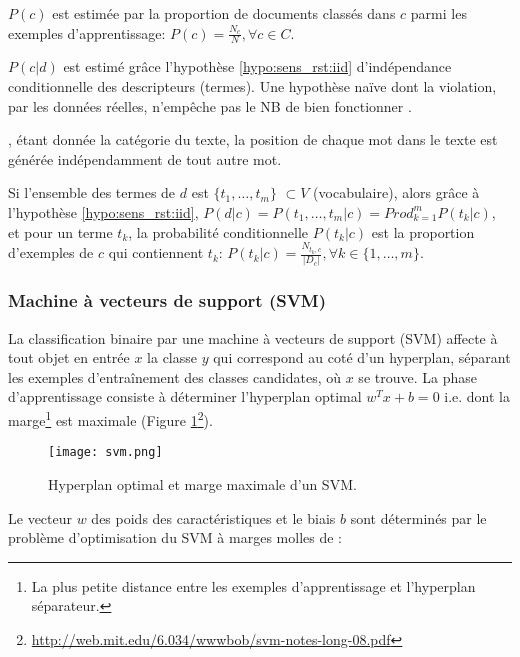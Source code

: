 $P(c)$ est estimée par la proportion de documents classés dans $c$ parmi les exemples d'apprentissage: $P(c) = \frac{N_c}{N}, \forall c \in C$.


 $P(c \vert d)$ est estimé grâce l'hypothèse \ref{hypo:sens_rst:iid} d'{indépendance conditionnelle des descripteurs (termes)}. Une hypothèse naïve dont la violation, par les données réelles, n'empêche pas le NB de bien fonctionner \citep{rish2001nb_study}. 

\begin{hypothese}, étant donnée la catégorie du texte, la position de chaque mot dans le texte est générée indépendamment de tout autre mot. \label{hypo:sens_rst:iid}
\end{hypothese}

Si l'ensemble des termes de $d$ est $\lbrace t_{1}, \dots, t_m \rbrace$ $\subset V$ (vocabulaire), alors grâce à l'hypothèse \ref{hypo:sens_rst:iid},
$P(d \vert c) = P(t_{1}, \dots, t_m\vert c) = Prod_{k=1}^m P(t_{k} \vert c)$, et pour un terme $t_k$, la probabilité conditionnelle $P(t_k \vert c)$ est la proportion d'exemples de $c$ qui contiennent $t_k$: $P(t_k \vert c) = \frac{N_{t_k,c}}{\vert D_c \vert }, \forall k \in \lbrace 1, \dots, m \rbrace$.

\subsubsection{Machine à vecteurs de support (SVM)}
\label{sec:sens-resultat:svm}
La classification binaire par une machine à vecteurs de support (SVM) \citep{vapnik1995statlearning} affecte à tout objet en entrée $x$ la classe $y$ qui correspond au coté d'un hyperplan, séparant les exemples d'entraînement des classes candidates, où $x$ se trouve. La phase d'apprentissage consiste à déterminer l'hyperplan optimal $w^T x + b = 0$ i.e. dont la marge\footnote{La plus petite distance entre les exemples d'apprentissage et l'hyperplan séparateur.} est maximale (Figure \ref{fig:sensresultat:svm}\footnote{\url{http://web.mit.edu/6.034/wwwbob/svm-notes-long-08.pdf}}).

\begin{figure}[!htb]
	\centering
	\texttt{[image: svm.png]}
	\caption{Hyperplan optimal et marge maximale d'un SVM.}\label{fig:sensresultat:svm}
\end{figure}

 Le vecteur $w$ des poids des caractéristiques et le biais $b$ sont déterminés par le problème d'optimisation du \og SVM à marges molles \fg{} de \citet{Cortes1995svm} :
 

